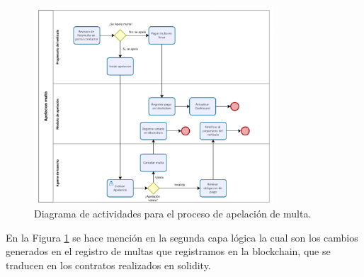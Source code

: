  \begin{figure}[htbp]
    \centering
    \includegraphics[width=0.8\textwidth]{Images/ActApelacion.png}
    \caption{Diagrama de actividades para el proceso de apelación de multa.}
    \label{fig:diagrama_apelacion}
\end{figure}
En la Figura \ref{fig:diagrama_apelacion} se hace mención en la segunda capa lógica la cual son los cambios generados en el registro de multas que registramos en la blockchain, que se traducen en los contratos realizados en solidity.
